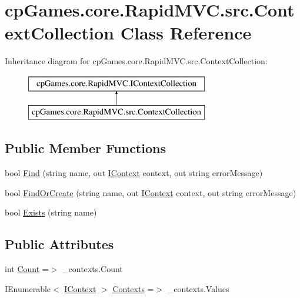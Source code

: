 \hypertarget{classcp_games_1_1core_1_1_rapid_m_v_c_1_1src_1_1_context_collection}{}\section{cp\+Games.\+core.\+Rapid\+M\+V\+C.\+src.\+Context\+Collection Class Reference}
\label{classcp_games_1_1core_1_1_rapid_m_v_c_1_1src_1_1_context_collection}
Inheritance diagram for cp\+Games.\+core.\+Rapid\+M\+V\+C.\+src.\+Context\+Collection\+:\begin{figure}[H]
\begin{center}
\leavevmode
\includegraphics[height=2.000000cm]{classcp_games_1_1core_1_1_rapid_m_v_c_1_1src_1_1_context_collection}
\end{center}
\end{figure}
\subsection*{Public Member Functions}
\begin{DoxyCompactItemize}
\item 
bool \mbox{\hyperlink{classcp_games_1_1core_1_1_rapid_m_v_c_1_1src_1_1_context_collection_a02fb5263a77b5b36b5f3e32a98686b12}{Find}} (string name, out \mbox{\hyperlink{interfacecp_games_1_1core_1_1_rapid_m_v_c_1_1_i_context}{I\+Context}} context, out string error\+Message)
\item 
bool \mbox{\hyperlink{classcp_games_1_1core_1_1_rapid_m_v_c_1_1src_1_1_context_collection_ad7d4663f1d96310bfba100e9140b11b8}{Find\+Or\+Create}} (string name, out \mbox{\hyperlink{interfacecp_games_1_1core_1_1_rapid_m_v_c_1_1_i_context}{I\+Context}} context, out string error\+Message)
\item 
bool \mbox{\hyperlink{classcp_games_1_1core_1_1_rapid_m_v_c_1_1src_1_1_context_collection_a298bbb09a2a4be911a460c436b1a913a}{Exists}} (string name)
\end{DoxyCompactItemize}
\subsection*{Public Attributes}
\begin{DoxyCompactItemize}
\item 
int \mbox{\hyperlink{classcp_games_1_1core_1_1_rapid_m_v_c_1_1src_1_1_context_collection_ae1df35e6c4ac300623ec7b8749049cc6}{Count}} =$>$ \+\_\+contexts.\+Count
\item 
I\+Enumerable$<$ \mbox{\hyperlink{interfacecp_games_1_1core_1_1_rapid_m_v_c_1_1_i_context}{I\+Context}} $>$ \mbox{\hyperlink{classcp_games_1_1core_1_1_rapid_m_v_c_1_1src_1_1_context_collection_a21d2c9c8e1e9760bdd85f47d50304f6d}{Contexts}} =$>$ \+\_\+contexts.\+Values
\end{DoxyCompactItemize}
